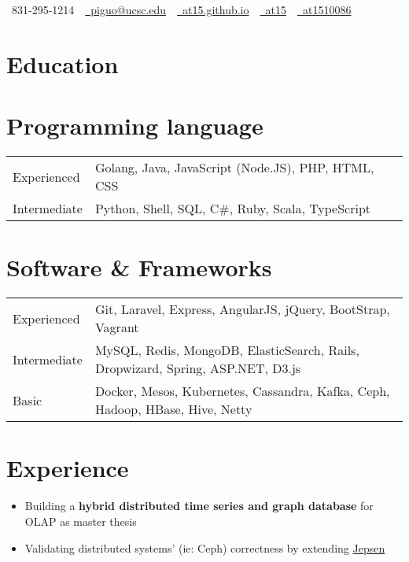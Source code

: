 \documentclass[10pt, letterpaper]{simple-cv}
\begin{document}
\centerline{\faMobile\ 831-295-1214\ \
\href{mailto:piguo@ucsc.edu}{\faEnvelope\ piguo@ucsc.edu}\ \
\href{https://at15.github.io}{\faHome\ at15.github.io}\ \
\href{https://github.com/at15}{\faGithubSquare\ at15}\ \
\href{https://www.linkedin.com/in/at1510086}{\faLinkedinSquare\ at1510086}}

\section{Education}

\section{Programming language}
\begin{tabular}{ l l }
 Experienced & Golang, Java, JavaScript (Node.JS), PHP, HTML, CSS \\
 Intermediate & Python, Shell, SQL, C\#, Ruby,  Scala, TypeScript \\
\end{tabular}

\section{Software \& Frameworks}
\begin{tabular}{ l l }
 Experienced & Git, Laravel, Express, AngularJS, jQuery, BootStrap, Vagrant \\
 Intermediate & MySQL, Redis, MongoDB, ElasticSearch, Rails, Dropwizard, Spring, ASP.NET, D3.js  \\
 Basic & Docker, Mesos, Kubernetes, Cassandra, Kafka, Ceph, Hadoop, HBase, Hive, Netty
\end{tabular}

\section{Experience}
\begin{itemize}
\item Building a \textbf{hybrid distributed time series and graph database} for OLAP as master thesis
\item Validating distributed systems' (ie: Ceph) correctness by extending \href{http://jepsen.io/}{Jepsen}
\end{itemize}
\end{document}
